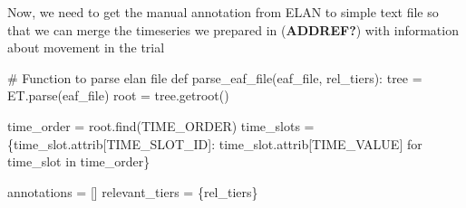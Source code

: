 \documentclass[
  letterpaper,
  DIV=11,
  numbers=noendperiod]{scrreprt}
\newenvironment{Shaded}{\begin{snugshade}}{\end{snugshade}}
\newcommand{\CommentTok}[1]{\textcolor[rgb]{0.37,0.37,0.37}{#1}}
\newcommand{\ControlFlowTok}[1]{\textcolor[rgb]{0.00,0.23,0.31}{#1}}
\newcommand{\KeywordTok}[1]{\textcolor[rgb]{0.00,0.23,0.31}{#1}}
\newcommand{\NormalTok}[1]{\textcolor[rgb]{0.00,0.23,0.31}{#1}}
\newcommand{\OperatorTok}[1]{\textcolor[rgb]{0.37,0.37,0.37}{#1}}
\newcommand{\StringTok}[1]{\textcolor[rgb]{0.13,0.47,0.30}{#1}}
\begin{document}
Now, we need to get the manual annotation from ELAN to simple text file
so that we can merge the timeseries we prepared in (\textbf{ADDREF?})
with information about movement in the trial

\begin{Shaded}
\begin{Highlighting}[]
\CommentTok{\# Function to parse elan file}
\KeywordTok{def}\NormalTok{ parse\_eaf\_file(eaf\_file, rel\_tiers):}
\NormalTok{    tree }\OperatorTok{=}\NormalTok{ ET.parse(eaf\_file)}
\NormalTok{    root }\OperatorTok{=}\NormalTok{ tree.getroot()}

\NormalTok{    time\_order }\OperatorTok{=}\NormalTok{ root.find(}\StringTok{\textquotesingle{}TIME\_ORDER\textquotesingle{}}\NormalTok{)}
\NormalTok{    time\_slots }\OperatorTok{=}\NormalTok{ \{time\_slot.attrib[}\StringTok{\textquotesingle{}TIME\_SLOT\_ID\textquotesingle{}}\NormalTok{]: time\_slot.attrib[}\StringTok{\textquotesingle{}TIME\_VALUE\textquotesingle{}}\NormalTok{] }\ControlFlowTok{for}\NormalTok{ time\_slot }\KeywordTok{in}\NormalTok{ time\_order\}}

\NormalTok{    annotations }\OperatorTok{=}\NormalTok{ []}
\NormalTok{    relevant\_tiers }\OperatorTok{=}\NormalTok{ \{rel\_tiers\}}


\end{Highlighting}
\end{Shaded}
\end{document}
